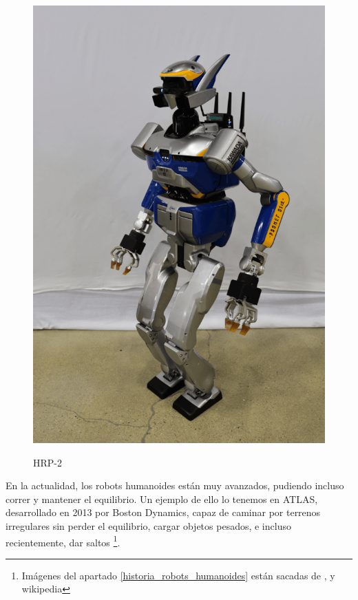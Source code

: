 \begin{figure}[H]
\centering
{\includegraphics[scale=0.2]{imagenes/apartado_2/213_HRP_2}}
\caption{HRP-2}
\label{figura213}
\end{figure}

En la actualidad, los robots humanoides están muy avanzados, pudiendo incluso correr y mantener el equilibrio. Un ejemplo de ello lo tenemos en ATLAS, desarrollado en 2013 por Boston Dynamics, capaz de caminar por terrenos irregulares sin perder el equilibrio, cargar objetos pesados, e incluso recientemente, dar saltos \cite{ref29}\footnote{Imágenes del apartado \ref{historia_robots_humanoides} están sacadas de \cite{ref34}, \cite{35} y wikipedia}.

